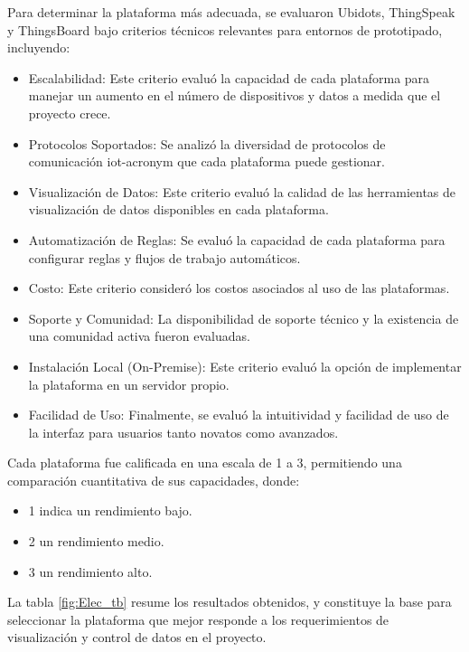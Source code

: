 Para determinar la plataforma más adecuada, se evaluaron Ubidots, ThingSpeak y ThingsBoard bajo criterios técnicos relevantes para entornos de prototipado, incluyendo:


\begin{itemize}
    \item Escalabilidad: Este criterio evaluó la capacidad de cada plataforma para manejar un aumento en el número de dispositivos y datos a medida que el proyecto crece.

    \item Protocolos Soportados: Se analizó la diversidad de protocolos de comunicación \acrshort{iot-acronym} que cada plataforma puede gestionar.

    \item Visualización de Datos: Este criterio evaluó la calidad de las herramientas de visualización de datos disponibles en cada plataforma.

    \item Automatización de Reglas: Se evaluó la capacidad de cada plataforma para configurar reglas y flujos de trabajo automáticos.

    \item Costo: Este criterio consideró los costos asociados al uso de las plataformas. 

    \item Soporte y Comunidad: La disponibilidad de soporte técnico y la existencia de una comunidad activa fueron evaluadas. 

    \item Instalación Local (On-Premise): Este criterio evaluó la opción de implementar la plataforma en un servidor propio.

    \item Facilidad de Uso: Finalmente, se evaluó la intuitividad y facilidad de uso de la interfaz para usuarios tanto novatos como avanzados.
\end{itemize}

Cada plataforma fue calificada en una escala de 1 a 3, permitiendo una comparación cuantitativa de sus capacidades, donde:
\begin{itemize}
    \item 1 indica un rendimiento bajo.
    \item 2 un rendimiento medio.
    \item 3 un rendimiento alto.
\end{itemize}

La tabla \ref{fig:Elec_tb} resume los resultados obtenidos, y constituye la base para seleccionar la plataforma que mejor responde a los requerimientos de visualización y control de datos en el proyecto.

